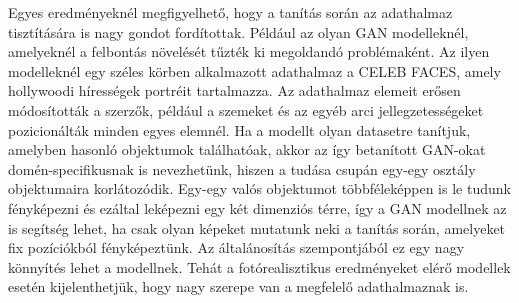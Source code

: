 Egyes eredményeknél megfigyelhető, hogy a tanítás során az adathalmaz tisztítására is nagy gondot fordítottak. Például az olyan GAN modelleknél, amelyeknél a felbontás növelését tűzték ki megoldandó problémaként. Az ilyen modelleknél egy széles körben alkalmazott adathalmaz a CELEB FACES, amely hollywoodi hírességek portréit tartalmazza. Az adathalmaz elemeit erősen módosították a szerzők, például a szemeket és az egyéb arci jellegzetességeket pozicionálták minden egyes elemnél.
Ha a modellt olyan datasetre tanítjuk, amelyben hasonló objektumok találhatóak, akkor az így betanított GAN-okat domén-specifikusnak is nevezhetünk, hiszen a tudása csupán egy-egy osztály objektumaira korlátozódik. Egy-egy valós objektumot többféleképpen is le tudunk fényképezni és ezáltal leképezni egy két dimenziós térre, így a GAN modellnek az is segítség lehet, ha csak olyan képeket mutatunk neki a tanítás során, amelyeket fix pozíciókból fényképeztünk. Az általánosítás szempontjából ez egy nagy könnyítés lehet a modellnek.
Tehát a fotórealisztikus eredményeket elérő modellek esetén kijelenthetjük, hogy nagy szerepe van a megfelelő adathalmaznak is.

